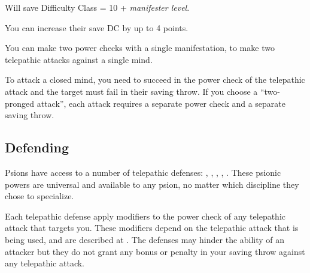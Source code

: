 \begin{itemize*}
	\item Will save Difficulty Class = 10 + \textit{manifester level}.
	\item You can increase their save DC by up to 4 points.
	\item You can make two power checks with a single manifestation, to make two telepathic attacks against a single mind.
\end{itemize*}

To attack a closed mind, you need to succeed in the power check of the telepathic attack and the target must fail in their saving throw. If you choose a ``two-pronged attack'', each attack requires a separate power check and a separate saving throw.

\subsection{Defending}
Psions have access to a number of telepathic defenses: , , , , . These psionic powers are universal and available to any psion, no matter which discipline they chose to specialize.

Each telepathic defense apply modifiers to the power check of any telepathic attack that targets you. These modifiers depend on the telepathic attack that is being used, and are described at . The defenses may hinder the ability of an attacker but they do not grant any bonus or penalty in your saving throw against any telepathic attack.


